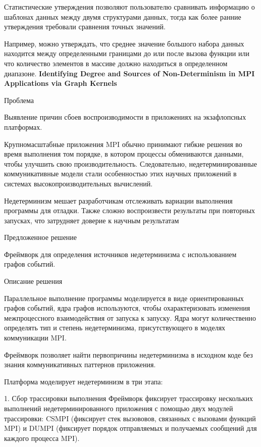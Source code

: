 Статистические утверждения позволяют пользователю сравнивать информацию о шаблонах данных между двумя структурами данных, тогда как более ранние утверждения требовали сравнения точных значений.

Например, можно утверждать, что среднее значение большого набора данных находится между определенными границами до или после вызова функции или что количество элементов в массиве должно находиться в определенном диапазоне.
\newline\newline
\textbf{Identifying Degree and Sources of Non-Determinism in MPI Applications via Graph Kernels}
\newline

Проблема

Выявление причин сбоев воспроизводимости в приложениях на экзафлопсных платформах.

Крупномасштабные приложения MPI обычно принимают гибкие решения во время выполнения том порядке, в котором процессы обмениваются данными, чтобы улучшить свою производительность. Следовательно, недетерминированные коммуникативные модели стали особенностью этих научных приложений в системах высокопроизводительных вычислений.

Недетерминизм мешает разработчикам отслеживать вариации выполнения программы для отладки. Также сложно воспроизвести результаты при повторных запусках, что затрудняет доверие к научным результатам
\newline

Предложенное решение

Фреймворк для определения источников недетерминизма с использованием графов событий. 
\newline

Описание решения

Параллельное выполнение программы моделируется в виде ориентированных графов событий, ядра графов используются, чтобы охарактеризовать изменения межпроцессного взаимодействия от запуска к запуску. Ядра могут количественно определять тип и степень недетерминизма, присутствующего в моделях коммуникации MPI.

Фреймворк позволяет найти первопричины недетерминизма в исходном коде без знания коммуникативных паттернов приложения.
 
Платформа моделирует недетерминизм в три этапа: 

1.	Сбор трассировки выполнения
Фреймворк фиксирует трассировку нескольких выполнений недетерминированного приложения с помощью двух модулей трассировки: CSMPI (фиксирует стек вызововов, связанных с вызовами функций MPI) и DUMPI (фиксирует порядок отправляемых и получаемых сообщений для каждого процесса MPI).

